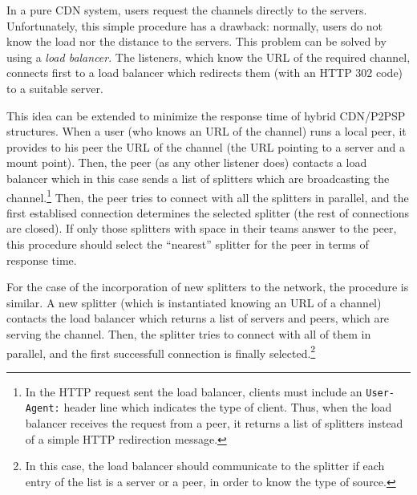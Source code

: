 

In a pure CDN system, users request the channels directly to the
servers. Unfortunately, this simple procedure has a drawback:
normally, users do not know the load nor the distance to the
servers. This problem can be solved by using a \emph{load
  balancer}. The listeners, which know the URL of the required
channel, connects first to a load balancer which redirects them (with
an HTTP 302 code) to a suitable server.

This idea can be extended to minimize the response time of hybrid
CDN/P2PSP structures. When a user (who knows an URL of the channel)
runs a local peer, it provides to his peer the URL of the channel (the
URL pointing to a server and a mount point). Then, the peer (as any
other listener does) contacts a load balancer which in this case sends
a list of splitters which are broadcasting the channel.\footnote{In
  the HTTP request sent the load balancer, clients must include an
  \texttt{User-Agent:} header line which indicates the type of
  client. Thus, when the load balancer receives the request from a
  peer, it returns a list of splitters instead of a simple HTTP
  redirection message.}  Then, the peer tries to connect with all the
splitters in parallel, and the first establised connection determines
the selected splitter (the rest of connections are closed). If only
those splitters with space in their teams answer to the peer, this
procedure should select the ``nearest'' splitter for the peer in terms
of response time.

For the case of the incorporation of new splitters to the network, the
procedure is similar. A new splitter (which is instantiated knowing an
URL of a channel) contacts the load balancer which returns a list of
servers and peers, which are serving the channel. Then, the splitter
tries to connect with all of them in parallel, and the first
successfull connection is finally selected.\footnote{In this case, the
  load balancer should communicate to the splitter if each entry of
  the list is a server or a peer, in order to know the type of
  source.}

